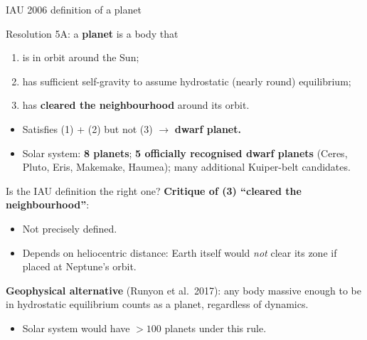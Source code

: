 \documentclass[aspectratio=169, 11pt]{beamer}
\begin{document}
\begin{frame}{IAU 2006 definition of a planet}
  \begin{block}{Resolution 5A: a \textbf{planet} is a body that}
    \begin{enumerate}
      \item is in orbit around the Sun;
      \item has sufficient self-gravity to assume hydrostatic (nearly round) equilibrium;
      \item has \textbf{cleared the neighbourhood} around its orbit.
    \end{enumerate}
  \end{block}
  \vskip6pt\relax
  \begin{itemize}
    \item Satisfies (1) + (2) but not (3) $\to$ \textbf{dwarf planet.}
    \item Solar system: \textbf{8 planets}; \textbf{5 officially recognised dwarf planets} (Ceres, Pluto, Eris, Makemake, Haumea); many additional Kuiper-belt candidates.
  \end{itemize}
\end{frame}

\begin{frame}{Is the IAU definition the right one?}
  \textbf{Critique of (3) ``cleared the neighbourhood''}:
  \vskip4pt\relax
  \begin{itemize}
    \item Not precisely defined.
    \item Depends on heliocentric distance: Earth itself would \emph{not} clear its zone if placed at Neptune's orbit.
  \end{itemize}
  \vskip6pt\relax
  \textbf{Geophysical alternative} (Runyon et al.\ 2017): any body massive enough to be in hydrostatic equilibrium counts as a planet, regardless of dynamics.
  \vskip4pt\relax
  \begin{itemize}
    \item Solar system would have $> 100$ planets under this rule.
  \end{itemize}
  \vskip6pt\relax
\end{frame}


\end{document}
